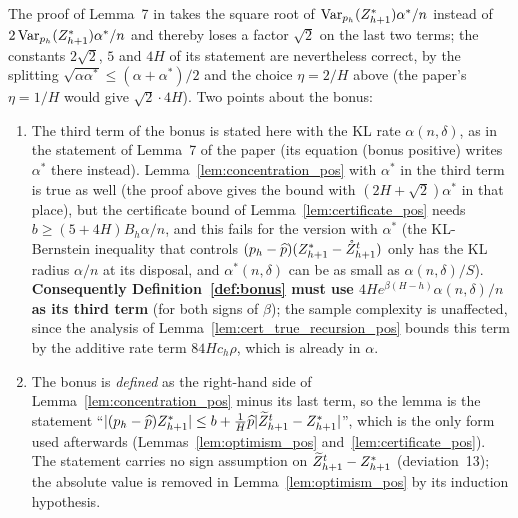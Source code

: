 \begin{remark}\label{rem:pos_constants_bonus}
The proof of Lemma~7 in \cite{essakine2026tight} takes the square root of
$\operatorname{Var}_{p_h}(Z^*_{h+1})\alpha^*/n$ instead of $2\operatorname{Var}_{p_h}(Z^*_{h+1})\alpha^*/n$ and thereby
loses a factor $\sqrt2$ on the last two terms; the constants $2\sqrt2$, $5$ and $4H$ of its
statement are nevertheless correct, by the splitting $\sqrt{\alpha\alpha^*} \le (\alpha + \alpha^*)/2$
and the choice $\eta = 2/H$ above (the paper's $\eta = 1/H$ would give $\sqrt2 \cdot 4H$).
Two points about the bonus:
\begin{enumerate}
  \item[(i)] The third term of the bonus is stated here with the KL rate $\alpha(n,\delta)$,
        as in the statement of Lemma~7 of the paper (its equation (bonus positive) writes
        $\alpha^*$ there instead). Lemma~\ref{lem:concentration_pos} with $\alpha^*$ in the
        third term is true as well (the proof above gives the bound with $(2H + \sqrt2)\alpha^*$ in
        that place), but the certificate bound of Lemma~\ref{lem:certificate_pos} needs
        $b \ge (5 + 4H) B_h \alpha/n$, and this fails for the version with $\alpha^*$ (the
        KL-Bernstein inequality that controls $(p_h - \widehat{p})(Z^*_{h+1} - \mathring{Z}^t_{h+1})$ only has the
        KL radius $\alpha/n$ at its disposal, and $\alpha^*(n,\delta)$ can be as small as
        $\alpha(n,\delta)/S$). \textbf{Consequently Definition~\ref{def:bonus} must use
        $4 H e^{\beta(H-h)}\alpha(n,\delta)/n$ as its third term} (for both signs of $\beta$);
        the sample complexity is unaffected, since the analysis of
        Lemma~\ref{lem:cert_true_recursion_pos} bounds this term by the additive rate term
        $84 H c_h \rho$, which is already in $\alpha$.
  \item[(ii)] The bonus is \emph{defined} as the right-hand side of
        Lemma~\ref{lem:concentration_pos} minus its last term, so the lemma is the statement
        ``$\lvert (p_h - \widehat{p})Z^*_{h+1} \rvert \le b + \frac1H\widehat{p}\lvert \widetilde{Z}^t_{h+1} - Z^*_{h+1} \rvert$'', which is
        the only form used afterwards (Lemmas~\ref{lem:optimism_pos} and~\ref{lem:certificate_pos}).
        The statement carries no sign assumption on $\widetilde{Z}^t_{h+1} - Z^*_{h+1}$ (deviation~13);
        the absolute value is removed in Lemma~\ref{lem:optimism_pos} by its induction hypothesis.
\end{enumerate}
\end{remark}

